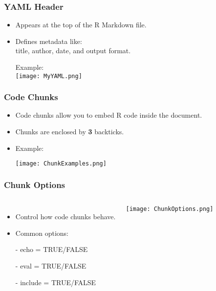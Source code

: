 \documentclass[xcolor=x11names,compress]{beamer}
\renewcommand{\(}{\begin{columns}}
\renewcommand{\)}{\end{columns}}
\newcommand{\<}[1]{\begin{column}{#1}}
\renewcommand{\>}{\end{column}}
\begin{document}
\begin{frame}
    \frametitle{YAML Header}
    \begin{itemize}[<+->]
        \item Appears at the top of the R Markdown file.
        \item Defines metadata like:\\
         title, author, date, and output format.
        \item[] Example: \\
        \texttt{[image: MyYAML.png]} %
   \end{itemize}
\end{frame}

\begin{frame}
    \frametitle{Code Chunks}
    \begin{itemize}[<+->]
        \item Code chunks allow you to embed R code inside the document.
        \item Chunks are enclosed by \textbf{3} backticks.
        \item Example:
      \item[]
       \texttt{[image: ChunkExamples.png]} 
          
    \end{itemize}
\end{frame}


\begin{frame}
    \frametitle{Chunk Options}
    \begin{columns}
            \begin{itemize}[<+->]
                \item Control how code chunks behave.
                \item Common options:
                \item[-] echo = TRUE/FALSE
                \item[-] eval = TRUE/FALSE
                \item[-] include = TRUE/FALSE
                
            \end{itemize} 
            \texttt{[image: ChunkOptions.png]}
    \end{columns}
\end{frame}
\end{document}
